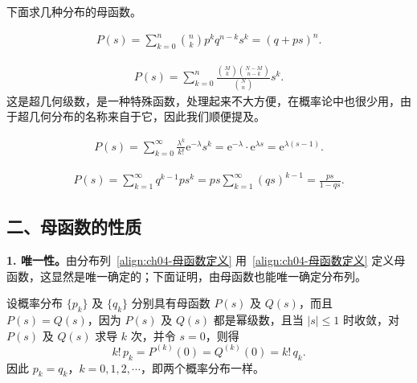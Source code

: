 \documentclass[../../main.tex]{subfiles}
\begin{document}
下面求几种分布的母函数。

\begin{example}[二项分布的母函数]\label{example:ch04-二项母函数}
\begin{align}
P(s)=\sum_{k=0}^n\binom{n}{k}p^k q^{n-k}s^k=(q+ps)^n.\label{align:ch04-二项母函数}
\end{align}
\end{example}

\begin{example}[超几何分布的母函数]\label{example:ch04-超几何母函数}
\begin{align}
P(s)=\sum_{k=0}^n\frac{\binom{M}{k}\binom{N-M}{n-k}}{\binom{N}{n}}s^k.\label{align:ch04-超几何母函数}
\end{align}
这是超几何级数，是一种特殊函数，处理起来不大方便，在概率论中也很少用，由于超几何分布的名称来自于它，因此我们顺便提及。
\end{example}

\begin{example}\label{example:ch04-Poisson母函数}
\begin{align}
P(s)=\sum_{k=0}^{\infty}\frac{\lambda^k}{k!}\mathrm{e}^{-\lambda}s^k
=\mathrm{e}^{-\lambda}\cdot\mathrm{e}^{\lambda s}=\mathrm{e}^{\lambda(s-1)}.\label{align:ch04-Poisson母函数}
\end{align}
\end{example}

\begin{example}[几何分布的母函数]\label{example:ch04-几何母函数}
\begin{align}
P(s)=\sum_{k=1}^{\infty}q^{k-1}ps^k
=ps\sum_{k=1}^{\infty}(qs)^{k-1}=\frac{ps}{1-qs}.\label{align:ch04-几何母函数}
\end{align}
\end{example}

\subsection*{二、母函数的性质}

\textbf{1. 唯一性。}\quad 由分布列~\eqref{align:ch04-母函数定义} 用~\eqref{align:ch04-母函数定义} 定义母函数，这显然是唯一确定的；下面证明，由母函数也能唯一确定分布列。

设概率分布 $\{p_k\}$ 及 $\{q_k\}$ 分别具有母函数 $P(s)$ 及 $Q(s)$，而且 $P(s)=Q(s)$，因为 $P(s)$ 及 $Q(s)$ 都是幂级数，且当 $|s|\leqslant 1$ 时收敛，对 $P(s)$ 及 $Q(s)$ 求导 $k$ 次，并令 $s=0$，则得
\[
k!\,p_k=P^{(k)}(0)=Q^{(k)}(0)=k!\,q_k.
\]
因此 $p_k=q_k$，$k=0,1,2,\cdots$，即两个概率分布一样。
\end{document}
